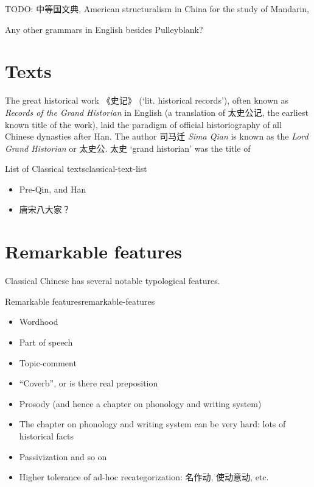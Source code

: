 \documentclass[UTF8, a4paper, oneside, scheme=plain, 12pt]{ctexrep}
\newcommand{\form}[1]{\emph{#1}}
\newcommand{\translate}[1]{`#1'}
\begin{document}
TODO: 中等国文典, American structuralism in China for the study of Mandarin,

Any other grammars in English besides Pulleyblank?

\section{Texts}\label{sec:introduction.text}

The great historical work 《史记》 (\translate{lit. historical records}),
often known as \form{Records of the Grand Historian} in English
(a translation of 太史公记, the earliest known title of the work),
laid the paradigm of official historiography of all Chinese dynasties after Han.
The author 司马迁 \form{Sima Qian} is known as the \form{Lord Grand Historian} or 太史公.
太史 \translate{grand historian} was the title of

\begin{todobox}{List of Classical texts}{classical-text-list}
    \begin{itemize}
        \item Pre-Qin, and Han
        \item 唐宋八大家？
    \end{itemize}
\end{todobox}

\section{Remarkable features}

Classical Chinese has several notable typological features.

\begin{todobox}{Remarkable features}{remarkable-features}
    \begin{itemize}
        \item Wordhood
        \item Part of speech
        \item Topic-comment
        \item ``Coverb'', or is there real preposition
        \item Prosody (and hence a chapter on phonology and writing system)
        \item The chapter on phonology and writing system can be very hard:
            lots of historical facts
        \item Passivization and so on
        \item Higher tolerance of ad-hoc recategorization: 名作动, 使动意动, etc.
    \end{itemize}
\end{todobox}
\end{document}
